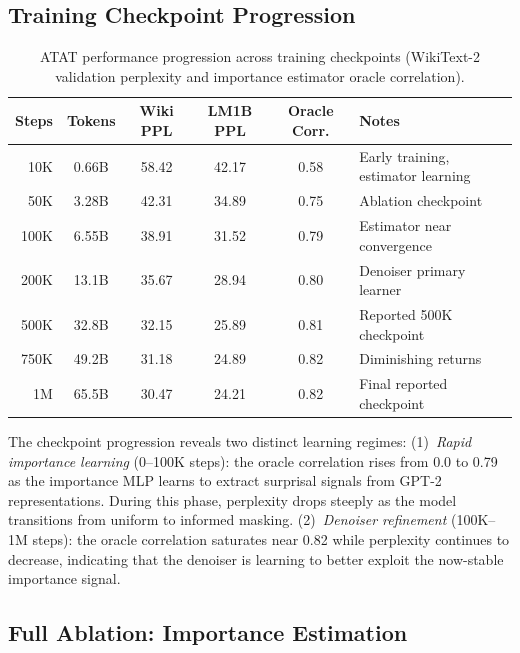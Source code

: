 \subsection{Training Checkpoint Progression}

\begin{table}[h]
\centering
\caption{ATAT performance progression across training checkpoints (WikiText-2 validation perplexity and importance estimator oracle correlation).}
\label{tab:checkpoint-progression}
\begin{tabular}{rccccl}
\toprule
\textbf{Steps} & \textbf{Tokens} & \textbf{Wiki PPL} & \textbf{LM1B PPL} & \textbf{Oracle Corr.} & \textbf{Notes} \\
\midrule
10K & 0.66B & 58.42 & 42.17 & 0.58 & Early training, estimator learning \\
50K & 3.28B & 42.31 & 34.89 & 0.75 & Ablation checkpoint \\
100K & 6.55B & 38.91 & 31.52 & 0.79 & Estimator near convergence \\
200K & 13.1B & 35.67 & 28.94 & 0.80 & Denoiser primary learner \\
500K & 32.8B & 32.15 & 25.89 & 0.81 & Reported 500K checkpoint \\
750K & 49.2B & 31.18 & 24.89 & 0.82 & Diminishing returns \\
1M & 65.5B & 30.47 & 24.21 & 0.82 & Final reported checkpoint \\
\bottomrule
\end{tabular}
\end{table}

The checkpoint progression reveals two distinct learning regimes: (1)~\textit{Rapid importance learning} (0--100K steps): the oracle correlation rises from 0.0 to 0.79 as the importance MLP learns to extract surprisal signals from GPT-2 representations. During this phase, perplexity drops steeply as the model transitions from uniform to informed masking. (2)~\textit{Denoiser refinement} (100K--1M steps): the oracle correlation saturates near 0.82 while perplexity continues to decrease, indicating that the denoiser is learning to better exploit the now-stable importance signal.

\subsection{Full Ablation: Importance Estimation}

